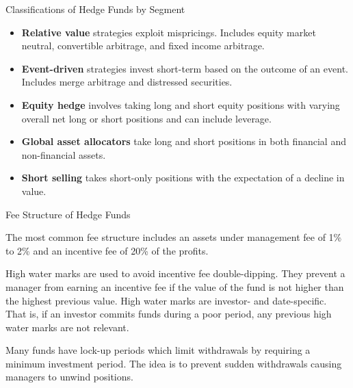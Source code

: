 \documentclass[../custom]{flashcards}
\begin{document}
\begin{flashcard}{Classifications of Hedge Funds by Segment}
    \begin{itemize}
        \item \textbf{Relative value} strategies exploit mispricings. Includes equity market neutral, convertible arbitrage, and fixed income arbitrage.
        \item \textbf{Event-driven} strategies invest short-term based on the outcome of an event. Includes merge arbitrage and distressed securities.
        \item \textbf{Equity hedge} involves taking long and short equity positions with varying overall net long or short positions and can include leverage.
        \item \textbf{Global asset allocators} take long and short positions in both financial and non-financial assets.
        \item \textbf{Short selling} takes short-only positions with the expectation of a decline in value.
    \end{itemize}
\end{flashcard}

\begin{flashcard}{Fee Structure of Hedge Funds}
    \begin{flushleft}
        The most common fee structure includes an assets under management fee of 1\% to 2\% and an incentive fee of 20\% of the profits.\newline

        High water marks are used to avoid incentive fee double-dipping. They prevent a manager from earning an incentive fee if the value of the fund is not higher than the highest previous value. High water marks are investor- and date-specific. That is, if an investor commits funds during a poor period, any previous high water marks are not relevant.\newline

        Many funds have lock-up periods which limit withdrawals by requiring a minimum investment period. The idea is to prevent sudden withdrawals causing managers to unwind positions.
    \end{flushleft}
\end{flashcard}
\end{document}
